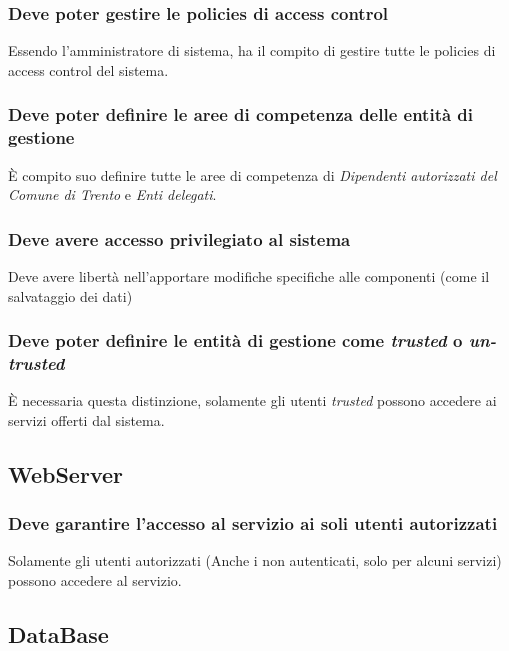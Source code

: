 \documentclass{article}
\begin{document}
\subsubsection{Deve poter gestire le policies di access control}
Essendo l'amministratore di sistema, ha il compito di gestire tutte le policies di access control del sistema.

\subsubsection{Deve poter definire le aree di competenza delle entità di gestione}
È compito suo definire tutte le aree di competenza di \textit{Dipendenti autorizzati del Comune di Trento} e \textit{Enti delegati}.

\subsubsection{Deve avere accesso privilegiato al sistema}
Deve avere libertà nell'apportare modifiche specifiche alle componenti (come il salvataggio dei dati)

\subsubsection{Deve poter definire le entità di gestione come \textit{trusted} o \textit{un-trusted}}
È necessaria questa distinzione, solamente gli utenti \textit{trusted} possono accedere ai servizi offerti dal sistema.

\subsection{WebServer}

\subsubsection{Deve garantire l'accesso al servizio ai soli utenti autorizzati}
Solamente gli utenti autorizzati (Anche i non autenticati, solo per alcuni servizi) possono accedere al servizio.

\subsection{DataBase}
\end{document}
